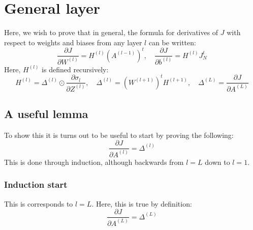 \documentclass[12pt, a4paper]{article}
\numberwithin{equation}{section}
\begin{document}
\section{General layer}
Here, we wish to prove that in general, the formula for derivatives of $J$ with respect to weights and biases from any layer $l$ can be written:
\begin{equation}
\frac{\partial J}{\partial W^{(l)}}=H^{(l)}\left(A^{(l-1)}\right)^t,\quad \frac{\partial J}{\partial b^{(l)}}=H^{(l)}J_N^t
\end{equation}
Here, $H^{(l)}$ is defined recursively:
\begin{equation}
H^{(l)}=\Delta^{(l)}\odot\frac{\partial\sigma_l}{\partial Z^{(l)}},\quad \Delta^{(l)}=\left(W^{(l+1)}\right)^t H^{(l+1)},\quad \Delta^{(L)}=\frac{\partial J}{\partial A^{(L)}}
\end{equation}

\subsection{A useful lemma}
To show this it is turns out to be useful to start by proving the following:
\begin{equation}
\frac{\partial J}{\partial A^{(l)}}=\Delta^{(l)}
\end{equation}
This is done through induction, although backwards from $l=L$ down to $l=1$.

\subsubsection{Induction start}
This is corresponds to $l=L$. Here, this is true by definition:
\begin{equation}
\frac{\partial J}{\partial A^{(L)}}=\Delta^{(L)}
\end{equation}
\end{document}

